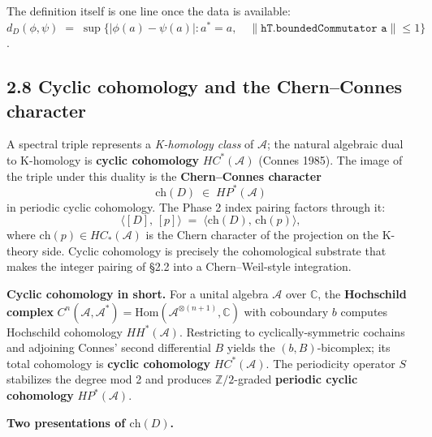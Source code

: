 \documentclass[
  11pt,
]{article}
\begin{document}
The definition itself is one line once the data is available:
\(d_D(\phi, \psi) \;=\; \sup\{|\phi(a) - \psi(a)| : a^* = a,\quad
\|\texttt{hT.boundedCommutator a}\| \leq 1\}\).

\subsection{2.8 Cyclic cohomology and the Chern--Connes
character}\label{cyclic-cohomology-and-the-chernconnes-character}

A spectral triple represents a \emph{K-homology class} of
\(\mathcal{A}\); the natural algebraic dual to K-homology is
\textbf{cyclic cohomology} \(HC^*(\mathcal{A})\) (Connes 1985). The
image of the triple under this duality is the \textbf{Chern--Connes
character} \[
\mathrm{ch}(D) \;\in\; HP^*(\mathcal{A})
\] in periodic cyclic cohomology. The Phase 2 index pairing factors
through it: \[
\bigl\langle [D],\,[p]\bigr\rangle
\;=\; \bigl\langle \mathrm{ch}(D),\,\mathrm{ch}(p)\bigr\rangle,
\] where \(\mathrm{ch}(p) \in HC_*(\mathcal{A})\) is the Chern character
of the projection on the K-theory side. Cyclic cohomology is precisely
the cohomological substrate that makes the integer pairing of §2.2 into
a Chern--Weil-style integration.

\textbf{Cyclic cohomology in short.} For a unital algebra
\(\mathcal{A}\) over \(\mathbb{C}\), the \textbf{Hochschild complex}
\(C^n(\mathcal{A}, \mathcal{A}^*) = \mathrm{Hom}(\mathcal{A}^{\otimes(n+1)}, \mathbb{C})\)
with coboundary \(b\) computes Hochschild cohomology
\(HH^*(\mathcal{A})\). Restricting to cyclically-symmetric cochains and
adjoining Connes' second differential \(B\) yields the
\((b, B)\)-bicomplex; its total cohomology is \textbf{cyclic cohomology}
\(HC^*(\mathcal{A})\). The periodicity operator \(S\) stabilizes the
degree mod 2 and produces \(\mathbb{Z}/2\)-graded \textbf{periodic
cyclic cohomology} \(HP^*(\mathcal{A})\).

\textbf{Two presentations of \(\mathrm{ch}(D)\).}
\end{document}
